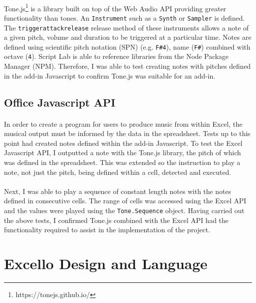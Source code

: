 \paragraph{} Tone.js\footnote{https://tonejs.github.io/} is a library built on top of the Web Audio API providing greater functionality than tones. An \texttt{Instrument} such as a \texttt{Synth} or \texttt{Sampler} is defined. The \texttt{triggerattackrelease} release method of these instruments allows a note of a given pitch, volume and duration to be triggered at a particular time. Notes are defined using scientific pitch notation (SPN) (e.g. \texttt{F\#4}), name (\texttt{F\#}) combined with octave (\texttt{4}). Script Lab is able to reference libraries from the Node Package Manager (NPM). Therefore, I was able to test creating notes with pitches defined in the add-in Javascript to confirm Tone.js was suitable for an add-in.

\subsection{Office Javascript API}

\paragraph{} In order to create a program for users to produce music from within Excel, the musical output must be informed by the data in the spreadsheet. Tests up to this point had created notes defined within the add-in Javascript. To test the Excel Javascript API, I outputted a note with the Tone.js library, the pitch of which was defined in the spreadsheet. This was extended so the instruction to play a note, not just the pitch, being defined within a cell, detected and executed.

\paragraph{} Next, I was able to play a sequence of constant length notes with the notes defined in consecutive cells.  The range of cells was accessed using the Excel API and the values were played using the \texttt{Tone.Sequence} object. Having carried out the above tests, I confirmed Tone.js combined with the Excel API had the functionality required to assist in the implementation of the project.

\section{Excello Design and Language}

